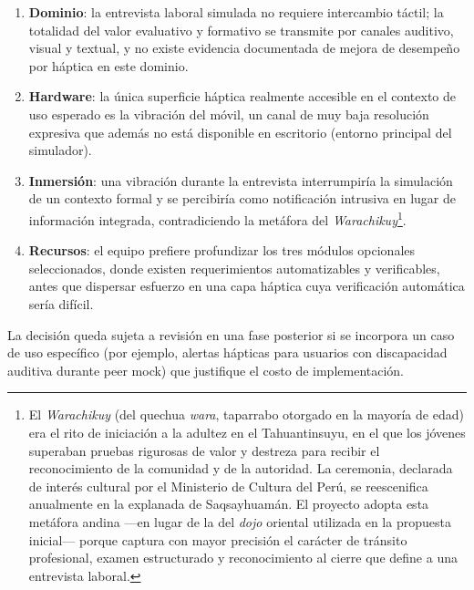 \begin{enumerate}
  \item \textbf{Dominio}: la entrevista laboral simulada no requiere
        intercambio táctil; la totalidad del valor evaluativo y
        formativo se transmite por canales auditivo, visual y textual,
        y no existe evidencia documentada de mejora de desempeño por
        háptica en este dominio.
  \item \textbf{Hardware}: la única superficie háptica realmente
        accesible en el contexto de uso esperado es la vibración del
        móvil, un canal de muy baja resolución expresiva que además no
        está disponible en escritorio (entorno principal del simulador).
  \item \textbf{Inmersión}: una vibración durante la entrevista
        interrumpiría la simulación de un contexto formal y se
        percibiría como notificación intrusiva en lugar de información
        integrada, contradiciendo la metáfora del
        \textit{Warachikuy}\footnote{El \textit{Warachikuy} (del quechua
        \textit{wara}, taparrabo otorgado en la mayoría de edad) era el
        rito de iniciación a la adultez en el Tahuantinsuyu, en el que
        los jóvenes superaban pruebas rigurosas de valor y destreza
        para recibir el reconocimiento de la comunidad y de la
        autoridad. La ceremonia, declarada de interés cultural por el
        Ministerio de Cultura del Perú, se reescenifica anualmente en
        la explanada de Saqsayhuamán. El proyecto adopta esta metáfora
        andina —en lugar de la del \textit{dojo} oriental utilizada en
        la propuesta inicial— porque captura con mayor precisión el
        carácter de tránsito profesional, examen estructurado y
        reconocimiento al cierre que define a una entrevista laboral.}.
  \item \textbf{Recursos}: el equipo prefiere profundizar los tres
        módulos opcionales seleccionados, donde existen requerimientos
        automatizables y verificables, antes que dispersar esfuerzo en
        una capa háptica cuya verificación automática sería difícil.
\end{enumerate}

\noindent La decisión queda sujeta a revisión en una fase posterior si
se incorpora un caso de uso específico (por ejemplo, alertas hápticas
para usuarios con discapacidad auditiva durante peer mock) que
justifique el costo de implementación.
